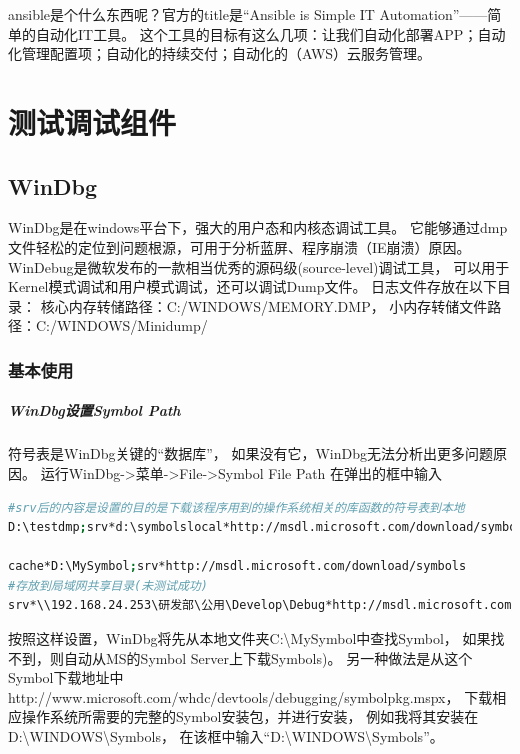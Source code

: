 \documentclass{book}
\begin{document}
ansible是个什么东西呢？官方的title是“Ansible is Simple IT Automation”——简单的自动化IT工具。
这个工具的目标有这么几项：让我们自动化部署APP；自动化管理配置项；自动化的持续交付；自动化的（AWS）云服务管理。




\chapter{测试调试组件}

\clearpage

\section{WinDbg}

WinDbg是在windows平台下，强大的用户态和内核态调试工具。
它能够通过dmp文件轻松的定位到问题根源，可用于分析蓝屏、程序崩溃（IE崩溃）原因。
WinDebug是微软发布的一款相当优秀的源码级(source-level)调试工具，
可以用于Kernel模式调试和用户模式调试，还可以调试Dump文件。
日志文件存放在以下目录：
核心内存转储路径：C:/WINDOWS/MEMORY.DMP，
小内存转储文件路径：C:/WINDOWS/Minidump/

\subsection{基本使用}

\paragraph{WinDbg设置Symbol Path}符号表是WinDbg关键的“数据库”，
如果没有它，WinDbg无法分析出更多问题原因。
运行WinDbg->菜单->File->Symbol File Path
在弹出的框中输入

\begin{lstlisting}[language=Bash]
#srv后的内容是设置的目的是下载该程序用到的操作系统相关的库函数的符号表到本地
D:\testdmp;srv*d:\symbolslocal*http://msdl.microsoft.com/download/symbols

cache*D:\MySymbol;srv*http://msdl.microsoft.com/download/symbols
#存放到局域网共享目录(未测试成功)
srv*\\192.168.24.253\研发部\公用\Develop\Debug*http://msdl.microsoft.com/download/symbols
\end{lstlisting}

按照这样设置，WinDbg将先从本地文件夹C:\textbackslash MySymbol中查找Symbol，
如果找不到，则自动从MS的Symbol Server上下载Symbols)。
另一种做法是从这个Symbol下载地址中http://www.microsoft.com/whdc/devtools/debugging/symbolpkg.mspx，
下载相应操作系统所需要的完整的Symbol安装包，并进行安装，
例如我将其安装在D:\textbackslash WINDOWS\textbackslash Symbols，
在该框中输入“D:\textbackslash WINDOWS\textbackslash Symbols”。
\end{document}
